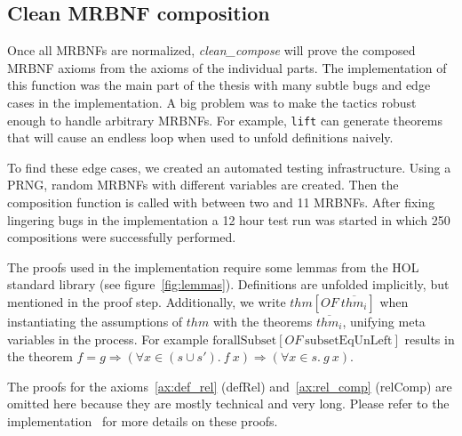 \subsection{Clean \acs{MRBNF} composition}\label{sec:clean_compose}

\newcommand{\OF}[2]{\ensuremath{#1[\textit{OF} \: #2]}}

Once all \acp{MRBNF} are normalized, \textit{clean\_compose} will prove the composed \ac{MRBNF} axioms from the axioms of the individual parts. The implementation of this function was the main part of the thesis with many subtle bugs and edge cases in the implementation. A big problem was to make the tactics robust enough to handle arbitrary \acp{MRBNF}. For example, \texttt{lift} can generate theorems that will cause an endless loop when used to unfold definitions naively.

To find these edge cases, we created an automated testing infrastructure. Using a \ac{PRNG}, random \acp{MRBNF} with different variables are created. Then the composition function is called with between two and 11 \acp{MRBNF}. After fixing lingering bugs in the implementation a 12 hour test run was started in which 250 compositions were successfully performed.

The proofs used in the implementation require some lemmas from the \ac{HOL} standard library (see figure~\ref{fig:lemmas}). Definitions are unfolded implicitly, but mentioned in the proof step. Additionally, we write $\OF{thm}{\overline{thm_i}}$ when instantiating the assumptions of $thm$ with the theorems $\overline{thm_i}$, unifying meta variables in the process. For example $\OF{\text{forallSubset}}{\text{subsetEqUnLeft}}$ results in the theorem $f = g \Longrightarrow (\forall x \in (s \cup s'). \: f \: x) \Longrightarrow (\forall x \in s. \: g \: x)$.

The proofs for the axioms~\ref{ax:def_rel} (defRel) and~\ref{ax:rel_comp} (relComp) are omitted here because they are mostly technical and very long. Please refer to the implementation~\cite{implementation} for more details on these proofs.

